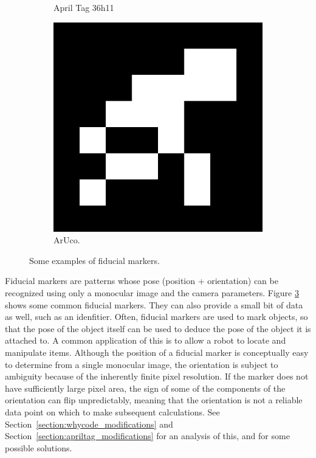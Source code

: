\begin{figure}[]
\begin{subfigure}[b]{0.2\linewidth}
        \caption{April Tag 36h11}
        \label{figure:apriltag36h11}
    \end{subfigure}
    \begin{subfigure}[b]{0.2\linewidth}
        \includegraphics[width=\textwidth]{images/aruco_33}
        \caption{ArUco.}
        \label{figure:aruco33}
    \end{subfigure}
    \caption{Some examples of fiducial markers.}
    \label{figure:fiducial_markers}
\end{figure}

Fiducial markers are patterns whose pose (position + orientation) can be recognized
using only a monocular image and the camera parameters.
Figure \ref{figure:fiducial_markers} shows some common fiducial markers.
They can also provide a small bit of data as well, such as an idenfitier.
Often, fiducial markers are used to mark objects, so that the pose of the object itself
can be used to deduce the pose of the object it is attached to.
A common application of this is to allow a robot to locate and manipulate items.
Although the position of a fiducial marker is conceptually easy to determine from
a single monocular image, the orientation is subject to ambiguity
because of the inherently finite pixel resolution.
If the marker does not have sufficiently large pixel area, the sign of some of the
components of the orientation can flip unpredictably, meaning that the orientation
is not a reliable data point on which to make subsequent calculations.
See Section~\ref{section:whycode_modifications} and Section~\ref{section:apriltag_modifications}
for an analysis of this, and for some possible solutions.
